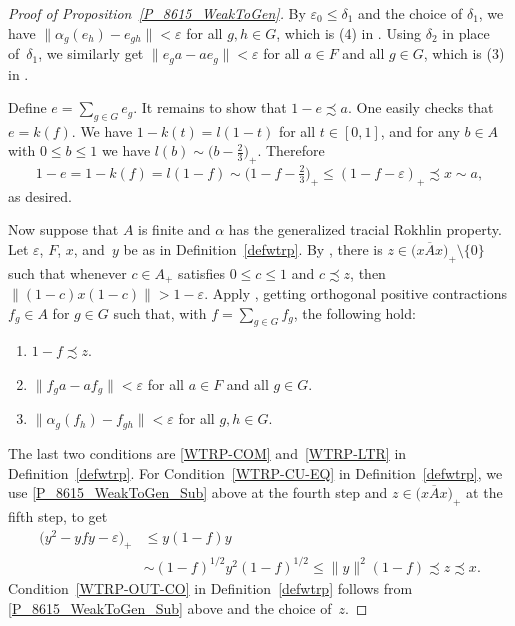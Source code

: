 \documentclass[11pt]{amsart}
\theoremstyle{plain}
\theoremstyle{definition}
\theoremstyle{remark}
\numberwithin{equation}{section}
\newcommand{\af}{\alpha}
\newcommand{\dt}{\delta}
\newcommand{\ep}{\varepsilon}
\begin{document}
\begin{proof}[Proof of Proposition~\ref{P_8615_WeakToGen}]
By $\varepsilon_0 \leq \dt_1$ and the choice of $\dt_1$,
we have
$\| \alpha_{g} (e_{h}) - e_{g h} \| < \varepsilon$ for all $g, h \in G$,
which is (4) in \cite[Definition 5.2]{HO13}.
Using $\dt_2$ in place of~$\dt_1$,
we similarly get
$\| e_{g} a - a e_{g} \| < \varepsilon$
for all $a \in F$ and all $g \in G$,
which is (3) in \cite[Definition 5.2]{HO13}.

Define $e = \sum_{g \in G} e_{g}$.
It remains to show that
$1 - e \precsim a$.
One easily checks that
$e = k (f)$.
We have
$1 - k (t) = l (1 - t)$
for all $t \in [0, 1]$,
and for any $b \in A$ with $0 \leq b \leq 1$
we have
$l (b) \sim \big( b - \frac{2}{3} \big)_{+}$.
Therefore
\[
1 - e
 = 1 - k (f)
 = l (1 - f)
 \sim \big( 1 - f - \tfrac{2}{3} \big)_{+}
 \leq (1 - f - \ep)_{+}
 \precsim x
 \sim a,
\]
as desired.

Now suppose that $A$ is finite
and $\af$ has the generalized tracial Rokhlin property.
Let $\varepsilon$, $F$, $x$, and~$y$
be as in Definition~\ref{defwtrp}.
By \cite[Lemma 2.9]{Ph14},
there is $z \in \big( {\overline{x A x}} \big)_{+} \setminus \{ 0 \}$
such that whenever $c \in A_{+}$ satisfies $0 \leq c \leq 1$
and $c \precsim z$,
then $\| (1 - c) x (1 - c) \| > 1 - \ep$.
Apply \cite[Definition 5.2]{HO13},
getting
orthogonal positive contractions
$f_g \in A$ for $g \in G$ such that,
with $f = \sum_{g \in G} f_{g}$,
the following hold:
%
\begin{enumerate}
\item\label{P_8615_WeakToGen_Sub}
$1 - f \precsim z$.
\item\label{P_8615_WeakToGen_Comm}
$\| f_{g} a - a f_{g} \| < \varepsilon$
for all $a \in F$ and all $g \in G$.
\item\label{P_8615_WeakToGen_LeftTr}
$\|\alpha_{g} (f_{h}) - f_{g h} \| < \varepsilon$ for all $g, h \in G$.
\end{enumerate}
%
The last two conditions are
\eqref{WTRP-COM} and~\eqref{WTRP-LTR}
in Definition~\ref{defwtrp}.
For Condition~\eqref{WTRP-CU-EQ} in Definition~\ref{defwtrp},
we use
\eqref{P_8615_WeakToGen_Sub} above at the fourth step
and $z \in \big( {\overline{x A x}} \big)_{+}$
at the fifth step,
to get
%
\begin{align*}
\big( y^{2} - y f y - \varepsilon \big)_{+}
& \leq y (1 - f) y
\\
& \sim (1 - f)^{1/2} y^2 (1 - f)^{1/2}
  \leq \| y \|^2 (1 - f)
  \precsim z
  \precsim x.
\end{align*}
%
Condition~\eqref{WTRP-OUT-CO} in Definition~\ref{defwtrp}
follows from \eqref{P_8615_WeakToGen_Sub} above
and the choice of~$z$.
\end{proof}
\end{document}
